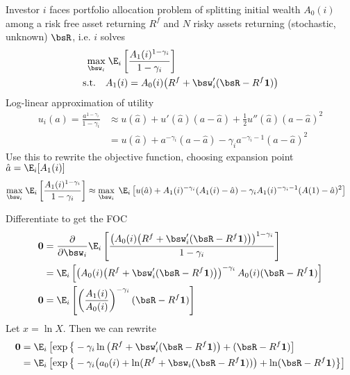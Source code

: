 \documentclass[12pt]{article}
\theoremstyle{plain}
\theoremstyle{definition}
\theoremstyle{remark}
\renewcommand{\bso}{\boldsymbol{0}}
\begin{document}
\clearpage
Investor $i$ faces portfolio allocation problem of splitting initial
wealth $A_0(i)$ among a risk free asset returning $R^f$ and $N$ risky
assets returning (stochastic, unknown) $\bsR$, i.e. $i$ solves
\begin{align*}
  \max_{\bsw_i}
  &\;\E_i\left[
      \frac{A_1(i)^{1-\gamma_i}}{1-\gamma_i}
      \right]
      \\
  \text{s.t.}\quad
  & A_1(i) = A_0(i)\big(R^f + \bsw_i'(\bsR-R^f\mathbf{1})\big)
\end{align*}
Log-linear approximation of utility
\begin{align*}
  u_i(a)
  = \frac{a^{1-\gamma_i}}{1-\gamma_i}
  &\approx
  u(\hat{a})
  + u'(\hat{a})(a-\hat{a})
  + \frac{1}{2}u''(\hat{a})(a-\hat{a})^2
  \\
  &=
  u(\hat{a})
  + a^{-\gamma_i}(a-\hat{a})
  - \gamma_i a^{-\gamma_i-1}(a-\hat{a})^2
\end{align*}
Use this to rewrite the objective function, choosing expansion point
$\hat{a}=\E_i[A_1(i)]$
\begin{align*}
  \max_{\bsw_i}
  &\;\E_i\left[
      \frac{A_1(i)^{1-\gamma_i}}{1-\gamma_i}
      \right]
  \approx
  \max_{\bsw_i}
  \;\E_i\left[
      u(\hat{a})
      + A_1(i)^{-\gamma_i}(A_1(i)-\hat{a})
      - \gamma_i A_1(i)^{-\gamma_i-1}(A(1)-\hat{a})^2
      \right]
\end{align*}



Differentiate to get the FOC
\begin{align*}
  \bso
  &=
  \frac{\partial}{\partial \bsw_i}
  \E_i\left[
      \frac{\left(A_0(i)\big(R^f + \bsw_i'(\bsR-R^f\mathbf{1})\big)\right)^{1-\gamma_i}}{1-\gamma_i}
      \right]
  \\
  &=
  \E_i\left[
    \left(A_0(i)\big(R^f + \bsw_i'(\bsR-R^f\mathbf{1})\big)\right)^{-\gamma_i}
    A_0(i)
    (\bsR-R^f\mathbf{1})
    \right]
  \\
  \bso
  &=
  \E_i\left[
    \left(\frac{A_1(i)}{A_0(i)}\right)^{-\gamma_i}
    (\bsR-R^f\mathbf{1})
    \right]
\end{align*}
Let $x=\ln X$. Then we can rewrite
\begin{align*}
  \bso
  &=
  \E_i\left[
    \exp\big\{
    -\gamma_i \ln\big(R^f+\bsw_i'(\bsR-R^f\mathbf{1})\big)
    +
    (\bsR-R^f\mathbf{1})
    \right]
  \\
  &=
  \E_i\left[
    \exp\big\{
    -\gamma_i\big(
      a_0(i) + \ln(R^f+\bsw_i(\bsR-R^f\mathbf{1}))
    \big)
    + \ln (\bsR-R^f\mathbf{1})
    \big\}
    \right]
\end{align*}
\end{document}
